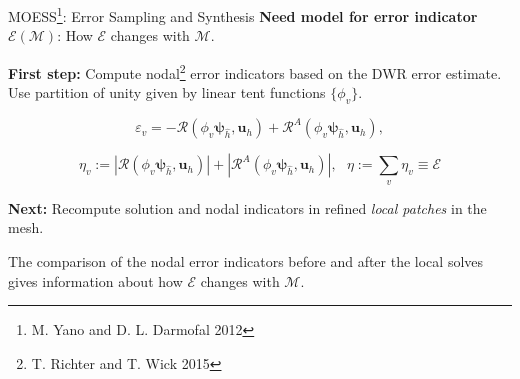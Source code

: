 \documentclass{beamer}
\newcounter{sectionframecount}
\begin{document}
\begin{frame}[t]{MOESS\footnote{M. Yano and D. L. Darmofal 2012}: Error Sampling and Synthesis}
\vspace{-5pt}
\textbf{Need model for error indicator $\mathcal{E}(\mathcal{M})$}: How $\mathcal{E}$ changes with $\mathcal{M}$.

\vspace{10pt}
\textbf{First step:} Compute nodal\footnote{T. Richter and T. Wick 2015} error indicators based on the DWR error estimate. Use partition of unity given by linear tent functions $\{\phi_v\}$.

\begin{equation}
  \varepsilon_v = -\mathcal{R}(\phi_v \boldsymbol{\psi}_{\hat{h}},\boldsymbol{u}_h) + \mathcal{R}^A(\phi_v\boldsymbol{\psi}_{\hat{h}},\boldsymbol{u}_h),
  \label{e:corrected_dwr_nodal}
\end{equation}

\begin{equation}
  \eta_v := |\mathcal{R}(\phi_v \boldsymbol{\psi}_{\hat{h}},\boldsymbol{u}_h)| + |\mathcal{R}^A(\phi_v\boldsymbol{\psi}_{\hat{h}},\boldsymbol{u}_h)|,~~~ \eta := \sum_{v} \eta_v \equiv \mathcal{E}
  \label{e:corrected_dwr_nodal}
\end{equation}

\textbf{Next:} Recompute solution and nodal indicators in refined \textit{local patches} in the mesh.

\vspace{5pt}
The comparison of the nodal error indicators before and after the local solves gives information about how $\mathcal{E}$ changes with $\mathcal{M}$.

\end{frame}

\end{document}
